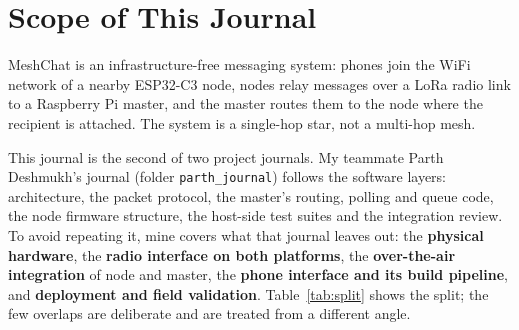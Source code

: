 \documentclass{tietreport}
\author{%
  \texttt{1024031043} Sanket Kamboj%
}
\begin{document}
\maketitle

\tableofcontents

\chapter{Scope of This Journal}

MeshChat is an infrastructure-free messaging system: phones join the
WiFi network of a nearby ESP32-C3 node, nodes relay messages over a
LoRa radio link to a Raspberry Pi master, and the master routes them
to the node where the recipient is attached. The system is a
single-hop star, not a multi-hop mesh.

This journal is the second of two project journals. My teammate
Parth Deshmukh's journal (folder \texttt{parth\_journal}) follows the
software layers: architecture, the packet protocol, the master's
routing, polling and queue code, the node firmware structure, the
host-side test suites and the integration review. To avoid
repeating it, mine covers what that journal leaves out: the
\textbf{physical hardware}, the \textbf{radio interface on both
platforms}, the \textbf{over-the-air integration} of node and master,
the \textbf{phone interface and its build pipeline}, and
\textbf{deployment and field validation}. Table~\ref{tab:split} shows
the split; the few overlaps are deliberate and are treated from a
different angle.
\end{document}
